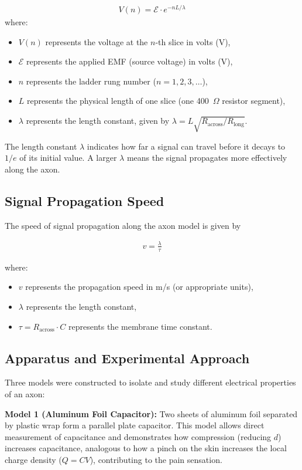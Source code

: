 \message{ !name(lab_report.tex)}\documentclass[12pt]{article}
\begin{document}
\begin{align*}
    V(n) = \mathcal{E} \cdot e^{-nL/\lambda}
\end{align*}
where:
\begin{itemize}
    \item $V(n)$ represents the voltage at the $n$-th slice in volts (V),
    \item $\mathcal{E}$ represents the applied EMF (source voltage) in volts (V),
    \item $n$ represents the ladder rung number ($n = 1, 2, 3, \ldots$),
    \item $L$ represents the physical length of one slice (one 400~$\Omega$ resistor segment),
    \item $\lambda$ represents the length constant, given by $\lambda = L\sqrt{R_{\text{across}}/R_{\text{long}}}$.
\end{itemize}

The length constant $\lambda$ indicates how far a signal can travel before it decays to $1/e$ of its initial value. A larger $\lambda$ means the signal propagates more effectively along the axon.

\subsection{Signal Propagation Speed}

The speed of signal propagation along the axon model is given by

\begin{align*}
    v = \frac{\lambda}{\tau}
\end{align*}

where:
\begin{itemize}
    \item $v$ represents the propagation speed in m/s (or appropriate units),
    \item $\lambda$ represents the length constant,
    \item $\tau = R_{\text{across}} \cdot C$ represents the membrane time constant.
\end{itemize}

\subsection{Apparatus and Experimental Approach}

Three models were constructed to isolate and study different electrical properties of an axon:

\textbf{Model 1 (Aluminum Foil Capacitor):} Two sheets of aluminum foil separated by plastic wrap form a parallel plate capacitor. This model allows direct measurement of capacitance and demonstrates how compression (reducing $d$) increases capacitance, analogous to how a pinch on the skin increases the local charge density ($Q = CV$), contributing to the pain sensation.
\end{document}

